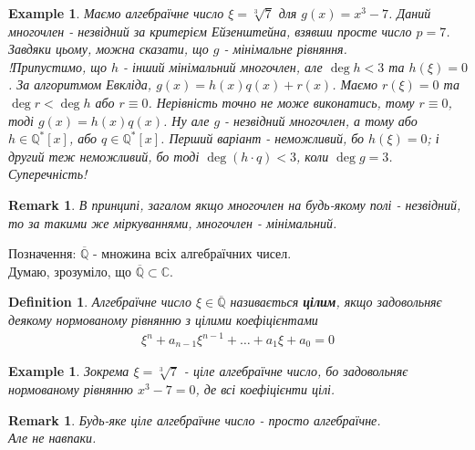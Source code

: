 \documentclass[a4paper, 14pt]{extarticle}
\theoremstyle{theoremdd}
\theoremstyle{theoremdd}
\newtheorem{definition}[theorem]{Definition}
\theoremstyle{theoremdd}
\theoremstyle{theoremdd}
\newtheorem{example}[theorem]{Example}
\theoremstyle{theoremdd}
\theoremstyle{theoremdd}
\newtheorem{remark}[theorem]{Remark}
\theoremstyle{theoremdd}
\theoremstyle{theoremdd}
\begin{document}
\begin{example}
Маємо алгебраїчне число $\xi = \sqrt[3]{7}$ для $g(x) = x^3 - 7$. Даний многочлен - незвідний за критерієм Ейзенштейна, взявши просте число $p = 7$. Завдяки цьому, можна сказати, що $g$ - мінімальне рівняння.\\
!Припустимо, що $h$ - інший мінімальний многочлен, але $\deg h < 3$ та $h(\xi) = 0$. За алгоритмом Евкліда, $g(x) = h(x)q(x) + r(x)$. Маємо $r(\xi) = 0$ та $\deg r < \deg h$ або $r \equiv 0$. Нерівність точно не може виконатись, тому $r \equiv 0$, тоді $g(x) = h(x)q(x)$.  Ну але $g$ - незвідний многочлен, а тому або $h \in \mathbb{Q}^*[x]$, або $q \in \mathbb{Q}^*[x]$. Перший варіант - неможливий, бо $h(\xi) = 0$; і другий теж неможливий, бо тоді $\deg (h \cdot q) < 3$, коли $\deg g = 3$. Суперечність!
\end{example}

\begin{remark}
В принципі, загалом якщо многочлен на будь-якому полі - незвідний, то за такими же міркуваннями, многочлен - мінімальний.
\end{remark}

Позначення: $\overline{\mathbb{Q}}$ - множина всіх алгебраїчних чисел.\\
Думаю, зрозуміло, що $\overline{\mathbb{Q}} \subset \mathbb{C}$.

\iffalse %
\begin{example}
Знайти мінімальний многочлен для $\xi = 1 + \sqrt{2} + \sqrt{3}$.
\end{example}
\fi

\begin{definition}
Алгебраїчне число $\xi \in \overline{\mathbb{Q}}$ називається \textbf{цілим}, якщо задовольняє деякому нормованому рівнянню з цілими коефіцієнтами
\begin{align*}
\xi^n + a_{n-1}\xi^{n-1} + \dots + a_1 \xi + a_0 = 0
\end{align*}
\end{definition}

\begin{example}
Зокрема $\xi = \sqrt[3]{7}$ - ціле алгебраїчне число, бо задовольняє нормованому рівнянню $x^3 - 7 = 0$, де всі коефіцієнти цілі.
\end{example}

\begin{remark}
Будь-яке ціле алгебраїчне число - просто алгебраїчне.\\
Але не навпаки.
\end{remark}
\end{document}
